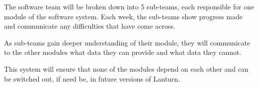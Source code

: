 The software team will be broken down into 5 sub-teams, each responsible for
one module of the software system. Each week, the sub-teams show progress made
and communicate any difficulties that have come across. 
\par

As sub-teams gain deeper understanding of their module, they will communicate
to the other modules what data they can provide and what data they cannot. 
\par

This system will ensure that none of the modules depend on each other and can
be switched out, if need be, in future versions of Lanturn.
\par

